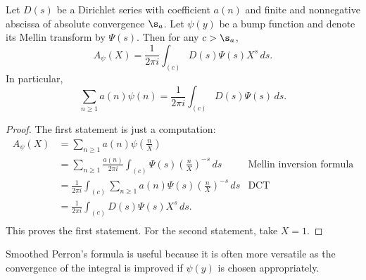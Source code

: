     \begin{theorem}
      Let $D(s)$ be a Dirichlet series with coefficient $a(n)$ and finite and nonnegative abscissa of absolute convergence $\s_{a}$. Let $\psi(y)$ be a bump function and denote its Mellin transform by $\Psi(s)$. Then for any $c > \s_{a}$,
      \[
        A_{\psi}(X) = \frac{1}{2\pi i}\int_{(c)}D(s)\Psi(s)X^{s}\,ds.
      \]
      In particular,
      \[
        \sum_{n \ge 1}a(n)\psi(n) = \frac{1}{2\pi i}\int_{(c)}D(s)\Psi(s)\,ds.
      \]
    \end{theorem}
    \begin{proof}
      The first statement is just a computation:
      \begin{align*}
        A_{\psi}(X) &= \sum_{n \ge 1}a(n)\psi\left(\frac{n}{X}\right) \\
        &= \sum_{n \ge 1}\frac{a(n)}{2\pi i}\int_{(c)}\Psi(s)\left(\frac{n}{X}\right)^{-s}\,ds & \text{Mellin inversion formula} \\
        &= \frac{1}{2\pi i}\int_{(c)}\sum_{n \ge 1}a(n)\Psi(s)\left(\frac{n}{X}\right)^{-s}\,ds & \text{DCT} \\
        &= \frac{1}{2\pi i}\int_{(c)}D(s)\Psi(s)X^{s}\,ds. \\
      \end{align*}
      This proves the first statement. For the second statement, take $X = 1$.
    \end{proof}

    Smoothed Perron's formula is useful because it is often more versatile as the convergence of the integral is improved if $\psi(y)$ is chosen appropriately.
